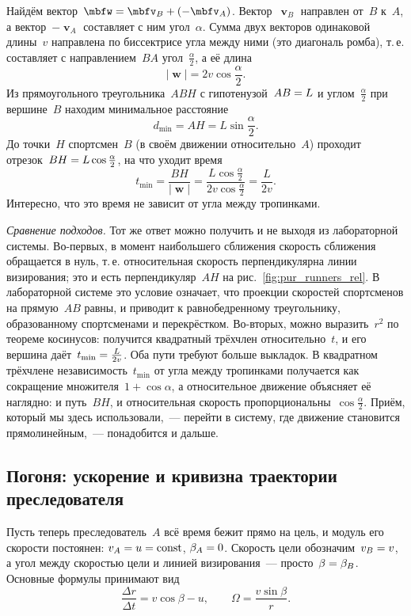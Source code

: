 \documentclass[../main.tex]{subfiles}
\begin{document}
\begin{example}
Найдём вектор~$\mbfw \hm= \mbfv_B + (-\mbfv_A)$. Вектор~$\mbfv_B$ направлен от~$B$ к~$A$,
а вектор~$-\mbfv_A$ составляет с ним угол~$\alpha$. Сумма двух векторов одинаковой
длины~$v$ направлена по биссектрисе угла между ними (это диагональ ромба), т.\,е.
составляет с направлением~$BA$ угол~$\frac{\alpha}{2}$, а её длина
\[
|\mbfw| = 2v\cos\frac{\alpha}{2}.
\]
Из прямоугольного треугольника~$ABH$ с гипотенузой~$AB \hm= L$ и углом~$\frac{\alpha}{2}$ при вершине~$B$ находим минимальное расстояние
\[
d_{\min} = AH = L\sin\frac{\alpha}{2}.
\]
До точки~$H$ спортсмен~$B$ (в своём движении относительно~$A$) проходит отрезок~$BH \hm= L\cos\frac{\alpha}{2}$, на что уходит время
\[
t_{\min} = \frac{BH}{|\mbfw|} = \frac{L\cos\frac{\alpha}{2}}{2v\cos\frac{\alpha}{2}} = \frac{L}{2v}.
\]
Интересно, что это время не зависит от угла между тропинками.

\noindent\textit{Сравнение подходов.} Тот же ответ можно получить и не выходя из
лабораторной системы. Во-первых, в момент наибольшего сближения скорость сближения
обращается в нуль, т.\,е. относительная скорость перпендикулярна линии визирования;
это и есть перпендикуляр~$AH$ на рис.~\ref{fig:pur_runners_rel}. В лабораторной
системе это условие означает, что проекции скоростей спортсменов на прямую~$AB$
равны, и приводит к равнобедренному треугольнику, образованному спортсменами и
перекрёстком. Во-вторых, можно выразить~$r^2$ по теореме косинусов: получится
квадратный трёхчлен относительно~$t$, и его вершина даёт~$t_{\min} \hm= \frac{L}{2v}$.
Оба пути требуют больше выкладок. В квадратном трёхчлене независимость~$t_{\min}$ от
угла между тропинками получается как сокращение множителя~$1 + \cos\alpha$, а
относительное движение объясняет её наглядно: и путь~$BH$, и относительная скорость
пропорциональны~$\cos\frac{\alpha}{2}$. Приём, который
мы здесь использовали,~--- перейти в систему, где движение становится
прямолинейным,~--- понадобится и дальше.
\end{example}

\subsection{Погоня: ускорение и кривизна траектории преследователя}

Пусть теперь преследователь~$A$ всё время бежит прямо на цель, и модуль его
скорости постоянен: $v_A \hm= u \hm= \mathrm{const}$, $\beta_A \hm= 0$. Скорость цели
обозначим~$v_B \hm= v$, а угол между скоростью цели и линией визирования~--- просто~$\beta \hm= \beta_B$. Основные формулы принимают вид
\[
\frac{\Delta r}{\Delta t} = v\cos\beta - u,
\qquad
\Omega = \frac{v\sin\beta}{r}.
\]
\end{document}
